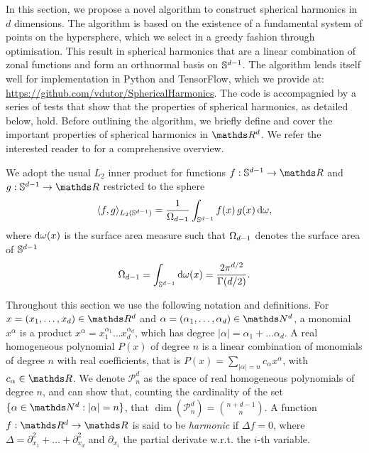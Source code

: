 In this section, we propose a novel algorithm to construct spherical harmonics in $d$ dimensions. The algorithm is based on the existence of a fundamental system of points on the hypersphere, which we select in a greedy fashion through optimisation. This result in spherical harmonics that are a linear combination of zonal functions and form an orthnormal basis on $\mathbb{S}^{d-1}$. The algorithm lends itself well for implementation in Python and TensorFlow, which we provide at: \url{https://github.com/vdutor/SphericalHarmonics}. The code is accompagnied by a series of tests that show that the properties of spherical harmonics, as detailed below, hold. Before outlining the algorithm, we briefly define and cover the important properties of spherical harmonics in $\Reals^d$. We refer the interested reader to \citet{dai2013,frye2014} for a comprehensive overview.

We adopt the usual $L_2$ inner product for functions $f: \dsphere \rightarrow \Reals$ and $g: \dsphere \rightarrow \Reals$ restricted to the sphere 
\begin{equation}
     \langle f, g\rangle_{L_{2}(\mathbb{S}^{d-1})} = \frac{1}{\Omega_{d-1}} \int_{\mathbb{S}^{d-1}} f(x)\,g(x) \, \mathrm{d}{\omega},
\end{equation}
where $\mathrm{d}{\omega(x)}$ is the surface area measure such that $\Omega_{d-1}$ denotes the surface area of $\mathbb{S}^{d-1}$ 
\begin{equation}
\label{eq:surface}
    \Omega_{d-1} = \int_{\mathbb{S}^{d-1}} \mathrm{d}{\omega(x)} = \frac{2 \pi ^ {d/2}}{\Gamma(d/2)}.
\end{equation}

Throughout this section we use the following notation and definitions. For $x = (x_1, \ldots, x_d) \in \Reals^d$ and $\alpha = (\alpha_1, \ldots, \alpha_d) \in \Naturals^d$, a monomial $x^\alpha$ is a product $x^\alpha = x_1^{\alpha_1} \ldots x_d^{\alpha_d}$, which has degree $|\alpha| = \alpha_1 + \ldots \alpha_d$. A real homogeneous polynomial $P(x)$ of degree $n$ is a linear combination of monomials of degree $n$ with real coefficients, that is $P(x) = \sum_{|\alpha| = n} c_{\alpha} x^{\alpha}$, with $c_\alpha \in \Reals$. We denote $\mathcal{P}_n^d$ as the space of real homogeneous polynomials of degree $n$, and can show that, counting the cardinality of the set $\{\alpha \in \Naturals^d: |\alpha| = n\}$, that $\dim(\mathcal{P}_n^d) = \binom{n + d -1}{n}$. A function $f:\Reals^d \rightarrow \Reals$ is said to be \emph{harmonic} if $\Delta f = 0$, where $\Delta = \partial_{x_1}^2 + \ldots + \partial_{x_d}^2$ and $\partial_{x_i}$ the partial derivate w.r.t. the $i$-th variable.


